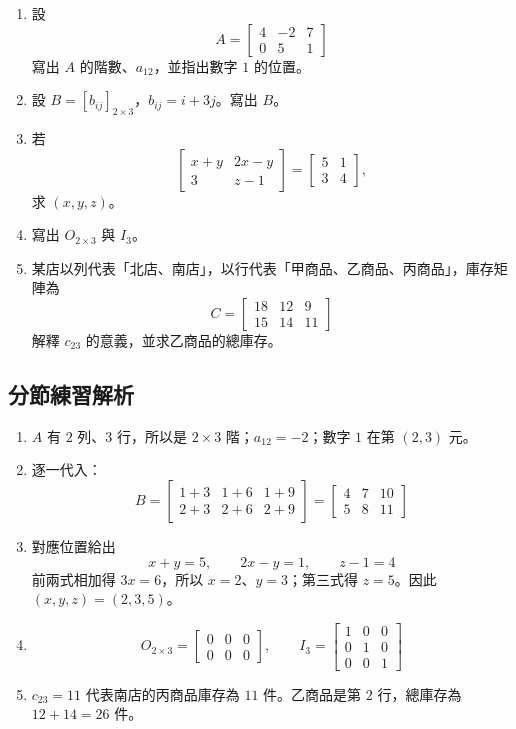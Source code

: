 \documentclass[11pt,a4paper]{article}
\begin{document}
\begin{enumerate}
\def\labelenumi{\arabic{enumi}.}
\item
  設
  \[A=\begin{bmatrix}4&-2&7\\0&5&1\end{bmatrix}\]
  寫出 \(A\) 的階數、\(a_{12}\)，並指出數字 \(1\) 的位置。
\item
  設 \(B=[b_{ij}]_{2\times3}\)，\(b_{ij}=i+3j\)。寫出 \(B\)。
\item
  若
  \[
  \begin{bmatrix}x+y&2x-y\\3&z-1\end{bmatrix}
  =
  \begin{bmatrix}5&1\\3&4\end{bmatrix},
  \]
  求 \((x,y,z)\)。
\item
  寫出 \(O_{2\times3}\) 與 \(I_3\)。
\item
  某店以列代表「北店、南店」，以行代表「甲商品、乙商品、丙商品」，庫存矩陣為
  \[C=\begin{bmatrix}18&12&9\\15&14&11\end{bmatrix}\]
  解釋 \(c_{23}\) 的意義，並求乙商品的總庫存。
\end{enumerate}

\subsection{分節練習解析}\label{ux5206ux7bc0ux7df4ux7fd2ux89e3ux6790}

\begin{enumerate}
\def\labelenumi{\arabic{enumi}.}
\item
  \(A\) 有 \(2\) 列、\(3\) 行，所以是 \(2\times3\) 階；\(a_{12}=-2\)；數字 \(1\) 在第 \((2,3)\) 元。
\item
  逐一代入：
  \[
  B=\begin{bmatrix}
  1+3&1+6&1+9\\
  2+3&2+6&2+9
  \end{bmatrix}
  =\begin{bmatrix}4&7&10\\5&8&11\end{bmatrix}
  \]
\item
  對應位置給出
  \[x+y=5,\qquad 2x-y=1,\qquad z-1=4\]
  前兩式相加得 \(3x=6\)，所以 \(x=2\)、\(y=3\)；第三式得 \(z=5\)。因此 \((x,y,z)=(2,3,5)\)。
\item
  \[
   O_{2\times3}=\begin{bmatrix}0&0&0\\0&0&0\end{bmatrix},
   \qquad
   I_3=\begin{bmatrix}1&0&0\\0&1&0\\0&0&1\end{bmatrix}
   \]
\item
  \(c_{23}=11\) 代表南店的丙商品庫存為 \(11\) 件。乙商品是第 \(2\) 行，總庫存為 \(12+14=26\) 件。
\end{enumerate}
\end{document}

